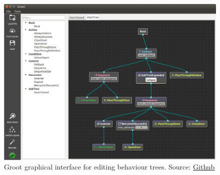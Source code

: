 \begin{figure}[htbp]
    \centering
    \includegraphics[width=1\linewidth]
    {Preliminaries/figures/groot.png}
    \caption{Groot graphical interface for editing behaviour trees. Source: \href{https://github.com/BehaviorTree/Groot}{Github}}
    \label{fig:groot}
\end{figure}

\endinput